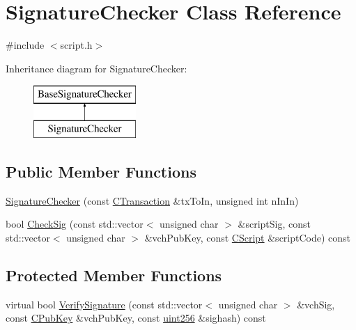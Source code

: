 \hypertarget{class_signature_checker}{}\section{Signature\+Checker Class Reference}
\label{class_signature_checker}


{\ttfamily \#include $<$script.\+h$>$}

Inheritance diagram for Signature\+Checker\+:\begin{figure}[H]
\begin{center}
\leavevmode
\includegraphics[height=2.000000cm]{class_signature_checker}
\end{center}
\end{figure}
\subsection*{Public Member Functions}
\begin{DoxyCompactItemize}
\item 
\hyperlink{class_signature_checker_a698e6832345449c494a12960f173d6a1}{Signature\+Checker} (const \hyperlink{class_c_transaction}{C\+Transaction} \&tx\+To\+In, unsigned int n\+In\+In)
\item 
bool \hyperlink{class_signature_checker_a174607620e5510a69f9083ed68e01776}{Check\+Sig} (const std\+::vector$<$ unsigned char $>$ \&script\+Sig, const std\+::vector$<$ unsigned char $>$ \&vch\+Pub\+Key, const \hyperlink{class_c_script}{C\+Script} \&script\+Code) const 
\end{DoxyCompactItemize}
\subsection*{Protected Member Functions}
\begin{DoxyCompactItemize}
\item 
virtual bool \hyperlink{class_signature_checker_a93e6518f83ea215af9c3266de43b5df1}{Verify\+Signature} (const std\+::vector$<$ unsigned char $>$ \&vch\+Sig, const \hyperlink{class_c_pub_key}{C\+Pub\+Key} \&vch\+Pub\+Key, const \hyperlink{classuint256}{uint256} \&sighash) const 
\end{DoxyCompactItemize}


